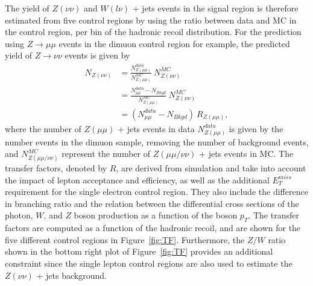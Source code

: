 The yield of $Z(\nu\nu)$ and $W(l\nu)$ + jets events in the signal region is therefore estimated from five control regions by using the ratio between data and MC in the control region, per bin of the hadronic recoil distribution. For the prediction using $Z\rightarrow \mu\mu$ events in the dimuon control region for example, the predicted yield of $Z\rightarrow\nu\nu$ events is given by
\begin{align}
 N_{Z(\nu\nu)} &= \frac{N_{Z(\mu\mu)}^{data}}{N_{Z(\mu\mu)}^{MC}}\ N_{Z(\nu\nu)}^{MC}\\
 &= \frac{N_{\mu\mu}^{data} - N_{Bkgd}}{N_{Z(\mu\mu)}^{MC}}\ N_{Z(\nu\nu)}^{MC} \\
 &= \left(N_{\mu\mu}^{data} - N_{Bkgd}\right)\ R_{Z(\mu\mu)},
\end{align}
where the number of $Z(\mu\mu)$ + jets events in data $N_{Z(\mu\mu)}^{data}$ is given by the number events in the dimuon sample, removing the number of background events, and $N_{Z(\mu\mu/\nu\nu)}^{MC}$ represent the number of $Z(\mu\mu/\nu\nu)$ + jets events in MC. The transfer factors, denoted by $R$, are derived from simulation and take into account the impact of lepton acceptance and efficiency, as well as the additional $E_T^{miss}$ requirement for the single electron control region. They also include the difference in branching ratio and the relation between the differential cross sections of the photon, $W$, and $Z$ boson production as a function of the boson $p_T$. The transfer factors are computed as a function of the hadronic recoil, and are shown for the five different control regions in Figure~\ref{fig:TF}. Furthermore, the $Z/W$ ratio shown in the bottom right plot of Figure~\ref{fig:TF} provides an additional constraint since the single lepton control regions are also used to  estimate the $Z(\nu\nu)$ + jets background.

